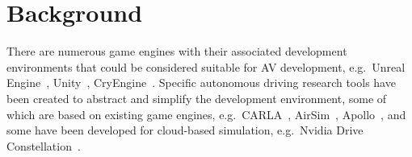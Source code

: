 \documentclass[letterpaper, 10 pt, journal, twoside]{IEEEtran}
\begin{document}
 
\section{Background} \label{s:background}

There are numerous game engines with their associated development environments that could be considered suitable for AV development, e.g.\ Unreal Engine~\cite{UE4_main_website}, Unity~\cite{Unity_main_website}, CryEngine~\cite{CryEngine_main_website}. Specific autonomous driving research tools have been created to abstract and simplify the development environment, some of which are based on existing game engines, e.g.\ CARLA~\cite{carla_main_website}, AirSim~\cite{AirSim_main_website}, Apollo~\cite{Apollo_main_website}, and some have been developed for cloud-based simulation, e.g.\ Nvidia Drive Constellation~\cite{nvidia_constellation}.
\end{document}
